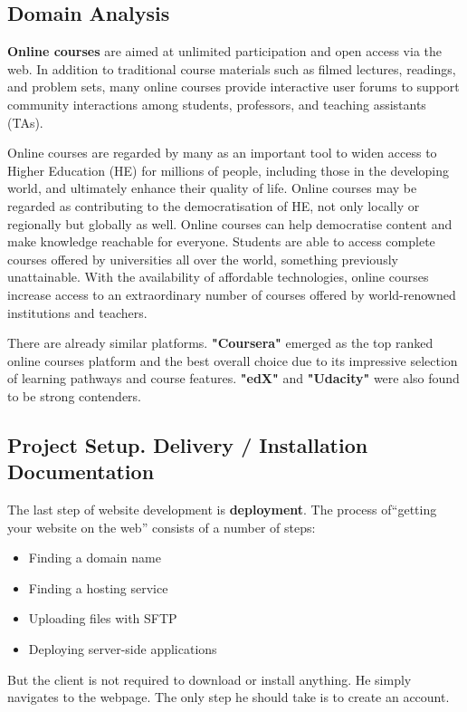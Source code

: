 \documentclass[12pt,a4paper,titlepage]{article}
\begin{document}
\subsection{Domain Analysis}
\textbf{Online courses} are aimed at unlimited participation and open access via the web. In addition to traditional course materials such as filmed lectures, readings, and problem sets, many online courses provide interactive user forums to support community interactions among students, professors, and teaching assistants (TAs).\par
Online courses are regarded by many as an important tool to widen access to Higher Education (HE) for millions of people, including those in the developing world, and ultimately enhance their quality of life. Online courses may be regarded as contributing to the democratisation of HE, not only locally or regionally but globally as well. Online courses can help democratise content and make knowledge reachable for everyone. Students are able to access complete courses offered by universities all over the world, something previously unattainable. With the availability of affordable technologies, online courses increase access to an extraordinary number of courses offered by world-renowned institutions and teachers.\par
There are already similar platforms. \textbf{"Coursera"} emerged as the top ranked online courses platform and the best overall choice due to its impressive selection of learning pathways and course features. \textbf{"edX"} and \textbf{"Udacity"} were also found to be strong contenders.

\subsection{Project Setup. Delivery / Installation Documentation}
The last step of website development is \textbf{deployment}. The process of“getting your website on the web” consists of a number of steps:
\begin{itemize}
\item Finding a domain name
\item Finding a hosting service
\item Uploading files with SFTP
\item Deploying server-side applications
\end{itemize}
But the client is not required to download or install anything. He simply navigates to the webpage. The only step he should take is to create an account.
\end{document}
